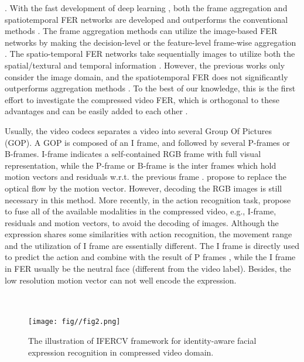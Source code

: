 \documentclass[a4paper,conference]{IEEEtran}
\begin{document}
. With the fast development of deep learning \cite{che2019deep,liu2020wasserstein,liu2020unimodal,liu2020importance,liu2020severity,he2020image,han2020wasserstein,liu2020auto3d}, both the frame aggregation and spatiotemporal FER networks are developed and outperforms the conventional methods \cite{liu2017line,liu2018joint}. The frame aggregation methods can utilize the image-based FER networks by making the decision-level \cite{kahou2016emonets} or the feature-level frame-wise aggregation \cite{xu2016video}. The spatio-temporal FER networks take sequentially images to utilize both the spatial/textural and temporal information \cite{al2018deep}. However, the previous works only consider the image domain, and the spatiotemporal FER does not significantly outperforms aggregation methods \cite{li2020deep}. To the best of our knowledge, this is the first effort to investigate the compressed video FER, which is orthogonal to these advantages and can be easily added to each other \cite{he2020classification,liu2019unimodal,liu2019conservative,liu2018ordinal,liu2018data}.  







 Usually, the video codecs separates a video into several Group Of Pictures (GOP). A GOP is composed of an I frame, and followed by several P-frames or B-frames. I-frame indicates a self-contained RGB frame with full visual representation, while the P-frame or B-frame is the inter frames which hold motion vectors and residuals w.r.t. the previous frame \cite{le1991mpeg}. \cite{zhang2016real} propose to replace the optical flow by the motion vector. However, decoding the RGB images is still necessary in this method. More recently, in the action recognition task, \cite{wu2018compressed} propose to fuse all of the available modalities in the compressed video, e.g., I-frame, residuals and motion vectors, to avoid the decoding of images. Although the expression shares some similarities with action recognition, the movement range and the utilization of I frame are essentially different. The I frame is directly used to predict the action and combine with the result of P frames \cite{wu2018compressed}, while the I frame in FER usually be the neutral face (different from the video label). Besides, the low resolution motion vector can not well encode the expression.     



\begin{figure}[t]
\centering
~\\~\\\texttt{[image: fig//fig2.png]}\\
\caption{The illustration of IFERCV framework for identity-aware facial expression recognition in compressed video domain.}\label{fig:2}
\end{figure}
\end{document}
